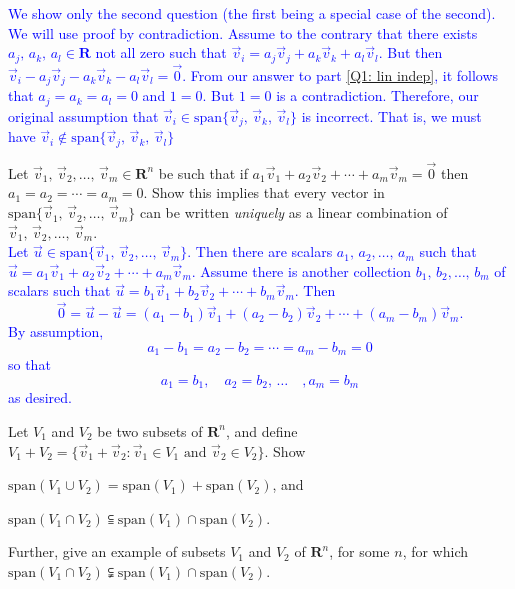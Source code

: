 \documentclass[a4paper,11pt]{article}
\newcommand{\R}{\mathbf{R}}
\newcommand{\BB}[1]{\textcolor{blue}{#1}}
\begin{document}
\begin{enumerate}[(a)]
  \BB{We show only the second question (the first being a special case of the
    second). We will use proof by contradiction. Assume to the contrary that
    there exists $a_j,\,a_k,\,a_l \in \R$ not all zero such that $\vec v_i
    = a_j\vec v_j + a_k\vec v_k + a_l\vec v_l$. But then $\vec v_i - a_j\vec v_j
    - a_k\vec v_k - a_l\vec v_l = \vec 0$. From our answer to part \ref{Q1: lin
      indep}, it follows that $a_j=a_k=a_l=0$ and $1=0$. But $1=0$ is a
    contradiction. Therefore, our original assumption that $\vec v_i \in
    \text{span}\{\vec v_j,\,\vec v_k,\,\vec v_l\}$ is incorrect. That is, we
    must have $\vec v_i \notin \text{span}\{\vec v_j,\,\vec v_k,\,\vec v_l\}$ \\}
\end{enumerate}

 Let $\vec v_1,\,\vec v_2,\dots,\,\vec v_m \in
\R^n$ be such that if $a_1\vec v_1 + a_2\vec v_2 + \cdots + a_m\vec v_m=\vec 0$
then $a_1=a_2=\cdots=a_m=0$. Show this implies that every vector in
$\text{span}\{\vec v_1,\,\vec v_2,\dots,\,\vec v_m\}$ can be written {\it
  uniquely} as a linear combination of $\vec v_1,\,\vec v_2,\dots,\,\vec v_m$. \\

\BB{Let $\vec u \in \text{span}\{\vec v_1,\,\vec v_2,\dots,\,\vec v_m\}$. Then
there are scalars $a_1,\,a_2,\dots,\,a_m$ such that $\vec u = a_1\vec v_1 +
a_2\vec v_2 + \cdots + a_m\vec v_m$. Assume there is another collection
$b_1,\,b_2,\dots,\,b_m$ of scalars such that $\vec u = b_1\vec v_1 + b_2\vec v_2
+ \cdots + b_m\vec v_m$. Then
\[
  \vec 0 = \vec u - \vec u =
  (a_1-b_1)\vec v_1 + (a_2-b_2)\vec v_2 + \cdots + (a_m-b_m)\vec v_m.
\]
By assumption,
\[
  a_1-b_1 = a_2-b_2 = \cdots = a_m-b_m = 0
\]
so that
\[
  a_1 = b_1, \quad a_2 = b_2,\, \dots\quad, a_m = b_m
\] as desired. \\}

 Let $V_1$ and $V_2$ be two subsets of $\R^n$, and
define $V_1+V_2=\{\vec v_1 + \vec v_2 : \vec v_1 \in V_1 \text{ and } \vec v_2
\in V_2 \}$. Show
\begin{enumerate*}[(a)]
\item $\text{span}(V_1 \cup V_2) = \text{span}(V_1) + \text{span}(V_2)$, and
\item $\text{span}(V_1 \cap V_2) \subseteqq \text{span}(V_1) \cap
  \text{span}(V_2)$.
\end{enumerate*}
Further, give an example of subsets $V_1$ and $V_2$ of $\R^n$, for some $n$, for
which $\text{span}(V_1 \cap V_2) \subsetneqq \text{span}(V_1) \cap
\text{span}(V_2)$. \\
\end{document}
